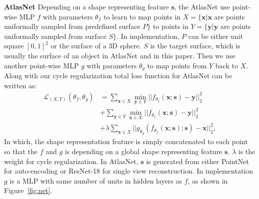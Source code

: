 \noindent\textbf{AtlasNet} Depending on a shape representing feature $\mathbf{s}$, the AtlasNet use point-wise MLP
$f$ with parameters $\theta_f$ to learn to map points in $X=\{\mathbf{x}| \mathbf{x}$ are points uniformally sampled from predefined surface $P\}$ to points in $Y=\{\mathbf{y}| \mathbf{y}$ are points uniformally sampled from surface $S\}$. In implementation, $P$ can be either unit square $[0,1]^2$ or the surface of a 3D sphere. $S$ is the target surface, which is usually the surface of an object in AtlasNet\cite{atlasnet} and in this paper. Then we use another point-wise MLP $g$ with parameters $\theta_g$ to map points from $Y$ back to $X$. Along with our cycle regularization  total loss function for AtlasNet can be written as:
\begin{equation}
\begin{aligned}
\label{equ:atlascycle}
\mathcal{L}_{(X,Y)}(\theta_f,\theta_g) &= \sum_{\mathbf{x} \in X} \min_{\mathbf{y} \in Y}|| f_{\theta_f}(\mathbf{x};\mathbf{s}) - \mathbf{y} ||_2^2 \\ &+ \sum_{ \mathbf{y} \in Y}\min_{ \mathbf{x} \in X} || f_{\theta_f}(\mathbf{x};\mathbf{s}) - \mathbf{y} ||_2^2 \\ &+ \lambda\sum_{\mathbf{x} \in X}||g_{\theta_g}(f_{\theta_f}(\mathbf{x};\mathbf{s});\mathbf{s}) - \mathbf{x}||_2^2,
\end{aligned}
 \end{equation}
In which, the shape representation feature is simply concatenated to each point so that the $f$ and $g$ is depending on a global shape representing feature $\mathbf{s}$. $\lambda$ is the weight for cycle regularization. In AtlasNet, $\mathbf{s}$ is generated from either PointNet\cite{resnet} for auto-encoding or ResNet-18\cite{resnet} for single view reconstruction. In implementation $g$ is a MLP with same number of units in hidden layers as $f$, as shown in Figure~\ref{fig:net}.

